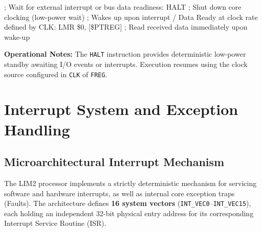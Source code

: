 \documentclass[11pt,a4paper]{article}
\newcommand{\reg}{\$}
\newcommand{\regPTREG}{\$PTREG}
\begin{document}
\begin{examplebox}[title={Usage Example (LIM2 Assembly)},top=2.5pt,bottom=2.5pt]
\begin{limasm}
; Wait for external interrupt or bus data readiness:
HALT                        ; Shut down core clocking (low-power wait)
; Wakes up upon interrupt / Data Ready at clock rate defined by CLK:
LMR  \reg0, [\regPTREG]     ; Read received data immediately upon wake-up
\end{limasm}
\vspace{0.5mm}
\footnotesize\color{limmuted}
\textbf{Operational Notes:} The \texttt{HALT} instruction provides deterministic low-power standby awaiting I/O events or interrupts. Execution resumes using the clock source configured in \texttt{CLK} of \texttt{FREG}.
\end{examplebox}


\clearpage
\section{Interrupt System and Exception Handling}

\subsection{Microarchitectural Interrupt Mechanism}

The LIM2 processor implements a strictly deterministic mechanism for servicing software and hardware interrupts, as well as internal core exception traps (Faults). The architecture defines \textbf{16 system vectors} (\texttt{INT\_VEC0}--\texttt{INT\_VEC15}), each holding an independent 32-bit physical entry address for its corresponding Interrupt Service Routine (ISR).
\end{document}
